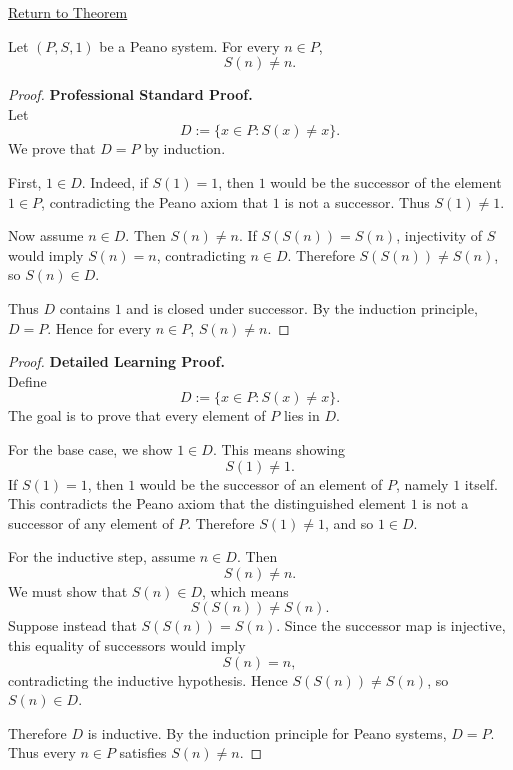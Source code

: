 \newpage
{}
\label{prf:no-object-is-its-own-successor}

\begin{remark*}[Return]
\hyperref[thm:no-object-is-its-own-successor]{Return to Theorem}
\end{remark*}

\begin{theorem*}
Let $(P,S,1)$ be a Peano system. For every $n \in P$,
\[
S(n) \neq n.
\]
\end{theorem*}

\begin{proof}
\textbf{Professional Standard Proof.}~\\
Let
\[
D:=\{x\in P:S(x)\neq x\}.
\]
We prove that $D=P$ by induction.

First, $1\in D$. Indeed, if $S(1)=1$, then $1$ would be the successor of the
element $1\in P$, contradicting the Peano axiom that $1$ is not a successor.
Thus $S(1)\neq 1$.

Now assume $n\in D$. Then $S(n)\neq n$. If $S(S(n))=S(n)$, injectivity of
$S$ would imply $S(n)=n$, contradicting $n\in D$. Therefore
$S(S(n))\neq S(n)$, so $S(n)\in D$.

Thus $D$ contains $1$ and is closed under successor. By the induction
principle, $D=P$. Hence for every $n\in P$, $S(n)\neq n$.
\end{proof}

\begin{proof}
\textbf{Detailed Learning Proof.}~\\
Define
\[
D:=\{x\in P:S(x)\neq x\}.
\]
The goal is to prove that every element of $P$ lies in $D$.

For the base case, we show $1\in D$. This means showing
\[
S(1)\neq 1.
\]
If $S(1)=1$, then $1$ would be the successor of an element of $P$, namely
$1$ itself. This contradicts the Peano axiom that the distinguished element
$1$ is not a successor of any element of $P$. Therefore $S(1)\neq 1$, and so
$1\in D$.

For the inductive step, assume $n\in D$. Then
\[
S(n)\neq n.
\]
We must show that $S(n)\in D$, which means
\[
S(S(n))\neq S(n).
\]
Suppose instead that $S(S(n))=S(n)$. Since the successor map is injective,
this equality of successors would imply
\[
S(n)=n,
\]
contradicting the inductive hypothesis. Hence $S(S(n))\neq S(n)$, so
$S(n)\in D$.

Therefore $D$ is inductive. By the induction principle for Peano systems,
$D=P$. Thus every $n\in P$ satisfies $S(n)\neq n$.
\end{proof}

